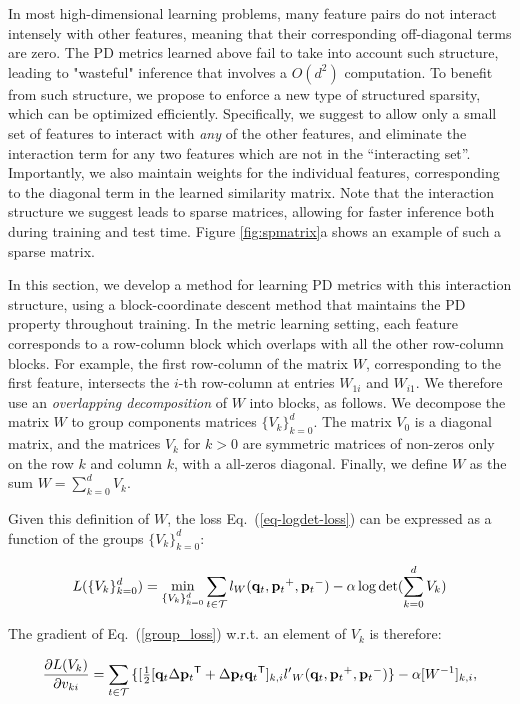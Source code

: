 \documentclass[twoside,11pt]{article}
\newcommand\mat[1]{{#1}}
\renewcommand\vec[1]{\mathbf{#1}}
\newcommand{\T}{{}^\mathsf{T}}
\newcommand{\W}{\mat{W}}
\newcommand{\q}{{\vec{q}}}
\newcommand{\p}{{\vec{p}}}
\newcommand{\trip}{{t}}
\newcommand{\qt}{{\q_{\trip}}}
\newcommand{\pt}{{\p_{\trip}}}
\newcommand{\triplet}{(\qt, \pt^{+}, \pt^{-})}
\newcommand{\Vk}{\mat{V_k}}
\newcommand{\Vg}{\{\Vk\}_{k=0}^{d}} %
\renewcommand{\eqref}[1]{Eq.~(\ref{#1})}
\begin{document}
In most high-dimensional learning problems, many feature pairs do not interact intensely with other features, meaning that their corresponding off-diagonal terms are zero. The PD metrics learned above fail to take into account such structure, leading to  "wasteful" inference that involves a $O(d^2)$ computation. To benefit from such structure, we propose to enforce a new type of structured sparsity, which can be optimized efficiently. Specifically, we suggest to allow only a small set of features to interact with \emph{any} of the other features, and eliminate the interaction term for any two features which are not in the ``interacting set''. Importantly, we also maintain weights for the individual features, corresponding to the diagonal term in the learned similarity matrix. Note that the interaction structure we suggest leads to sparse matrices, allowing for faster inference both during training and test time. 
Figure \ref{fig:spmatrix}a shows an example of such a sparse matrix.

In this section, we develop a method for learning PD metrics with this interaction structure, using a block-coordinate descent method that maintains the PD property throughout training.
In the metric learning setting, each feature corresponds to a row-column block which overlaps with all the other row-column blocks. For example, the first row-column of the matrix $\W$, corresponding to the first feature, intersects the $i$-th row-column at entries $W_{1i}$ and $W_{i1}$. We therefore use an \emph{overlapping decomposition} \citep{jacob2009group,obozinski2011group} of $W$ into blocks, as follows. 
We decompose the matrix $\W$ to group components matrices $\Vg$. The matrix $V_0$ is a diagonal matrix, and the matrices $V_k$ for $k>0$ are symmetric matrices of non-zeros only on the row $k$ and column $k$, with a all-zeros diagonal. Finally, we define $\W$ as the sum $\W = \sum_{k=0}^{d}{\Vk}$.


Given this definition of $\W$, the loss \eqref{eq-logdet-loss} can be expressed as a function of the groups $\Vg$:

\begin{equation}
L(\Vg) = 
  \min_{\Vg} \sum_{\trip \in \cal{T}}   l_{\W}(\qt, \pt^+, \pt^-) - \alpha \log \det(\sum_{k=0}^{d}{\Vk})
  \label{group_loss}
\end{equation} 

The gradient of \eqref{group_loss} w.r.t. an element of $\mat{V}_k$ is therefore:

\begin{equation}
  \frac{\partial {L (V_k)}}{\partial v_{ki}} = \sum\limits_{t\in \cal{T}}{\{
  [\tfrac{1}{2}[\q_{t}\Delta\p_{t}\T + \Delta\p_{t}\q_{t}\T]_{k,i}  }
  {l'}_W\triplet\} - \alpha [\W^{-1}]_{k,i},
  \label{grad_group}
\end{equation}
\end{document}
